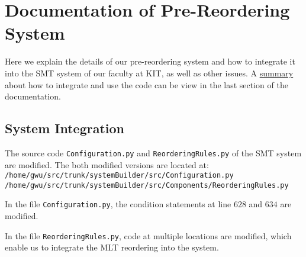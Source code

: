 

\appendix

{}	%
{}	%




%		
%		
%
%


\section{Documentation of Pre-Reordering System}
		\label{Documentation}

Here we explain the details of our pre-reordering system and how to integrate it into the SMT system of our faculty at KIT, as well as other issues. A \hyperref[summary]{summary} about how to integrate and use the code can be view in the last section of the documentation.

\subsection{System Integration}

The source code \verb|Configuration.py| and \verb|ReorderingRules.py| of the SMT system are modified. The both modified versions are located at:\\
\verb|/home/gwu/src/trunk/systemBuilder/src/Configuration.py|\\
\verb|/home/gwu/src/trunk/systemBuilder/src/Components/ReorderingRules.py|

In the file \verb|Configuration.py|, the condition statements at line $628$ and $634$ are modified.

In the file \verb|ReorderingRules.py|, code at multiple locations are modified, which enable us to integrate the MLT reordering into the system.

